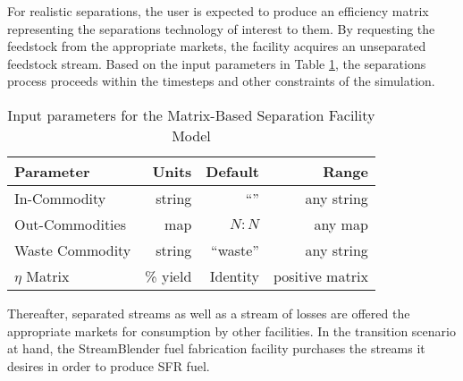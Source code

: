 For realistic separations, the user is expected to produce an efficiency 
matrix representing the separations technology of interest to them. 
By requesting the feedstock from the 
appropriate markets, the facility acquires an unseparated feedstock stream. 
Based on the input parameters  in Table \ref{tab:sepmatrix}, the separations 
process proceeds within the timesteps and other constraints of the simulation. 

\begin{table}[h!]
\centering
\begin{tabular}{|l|r|r|r|}
\hline
\textbf{Parameter} & \textbf{Units} & \textbf{Default} & \textbf{Range}\\ 
\hline
In-Commodity & string &``'' & any string \\
Out-Commodities & map & $N:N$ & any map \\
Waste Commodity & string & ``waste'' & any string\\
$\eta$ Matrix & \% yield & Identity & positive matrix \\
\hline
\end{tabular}
\caption{Input parameters for the Matrix-Based Separation Facility Model}
\label{tab:sepmatrix}
\end{table}

Thereafter, separated streams as well as a stream of losses are offered the 
appropriate markets for consumption by other facilities. In the transition 
scenario at hand, the StreamBlender fuel fabrication facility purchases the 
streams it desires in order to produce SFR fuel. 
